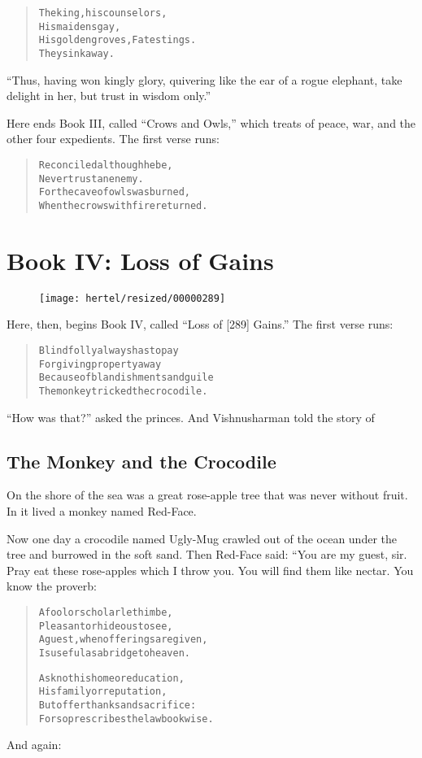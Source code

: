 \documentclass[article, twoside, 10pt]{memoir}
\renewenvironment{verbatim}{%
\begin{quote}%
\vskip -10pt%
\begin{alltt}\normalfont\small}{\end{alltt}%
\end{quote}%
\vskip -10pt
} %
\begin{document}
\begin{verbatim}
The king, his counselors,
    His maidens gay,
His golden groves, Fate stings.
    They sink away.
\end{verbatim}
``Thus, having won kingly glory, quivering like the ear of a rogue elephant, take delight in her, but trust in wisdom only.''

Here ends Book III, called ``Crows and Owls,'' which treats of
peace, war, and the other four expedients. The first verse runs:

\begin{verbatim}
Reconciled although he be,
Never trust an enemy.
For the cave of owls was burned,
When the crows with fire returned.
\end{verbatim}
\part{Book IV: Loss of Gains}

\begin{figure}[p]\texttt{[image: hertel/resized/00000289]}\end{figure}Here, then, begins Book IV, called ``Loss of [289] Gains.'' The
first verse runs:

\begin{verbatim}
Blind folly always has to pay
For giving property away
Because of blandishments and guile{\textemdash}
The monkey tricked the crocodile.
\end{verbatim}
``How was that?'' asked the princes. And Vishnusharman told the
story of

\chapter{The Monkey and the Crocodile}

On the shore of the sea was a great rose-apple tree that was never
without fruit. In it lived a monkey named Red-Face.

Now one day a crocodile named Ugly-Mug crawled out of the ocean
under the tree and burrowed in the soft sand. Then Red-Face said:
“You are my guest, sir. Pray eat these rose-apples which I throw
you. You will find them like nectar. You know the proverb:

\begin{verbatim}
A fool or scholar let him be,
Pleasant or hideous to see,
A guest, when offerings are given,
Is useful as a bridge to heaven.

Ask not his home or education,
His family or reputation,
But offer thanks and sacrifice:
For so prescribes the lawbook wise.
\end{verbatim}
And again:
\end{document}
